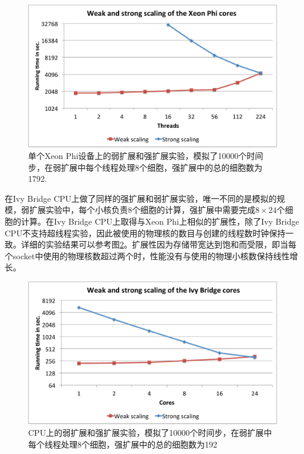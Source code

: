 \begin{figure}[htb]
\includegraphics[width=\linewidth]{figs/weakstrongscalePHI.pdf}
\caption{单个Xeon Phi设备上的弱扩展和强扩展实验，模拟了10000个时间步，在弱扩展中每个线程处理8个细胞，强扩展中的总的细胞数为1792.}
\label{fig:scaling}
\end{figure}

在Ivy Bridge CPU上做了同样的强扩展和弱扩展实验，唯一不同的是模拟的规模，弱扩展实验中，每个小核负责8个细胞的计算，强扩展中需要完成$8\times24$个细胞的计算。在Ivy Bridge CPU上取得与Xeon Phi上相似的扩展性，除了Ivy Bridge CPU不支持超线程实验，因此被使用的物理核的数目与创建的线程数时钟保持一致。详细的实验结果可以参考图\ref{fig:scaling2}。扩展性因为存储带宽达到饱和而受限，即当每个socket中使用的物理核数超过两个时，性能没有与使用的物理小核数保持线性增长。

\begin{figure}[htb]
\includegraphics[width=\linewidth]{figs/weakstrongscaleCPU.pdf}
\caption{CPU上的弱扩展和强扩展实验，模拟了10000个时间步，在弱扩展中每个线程处理8个细胞，强扩展中的总的细胞数为192}
\label{fig:scaling2}
\end{figure}

